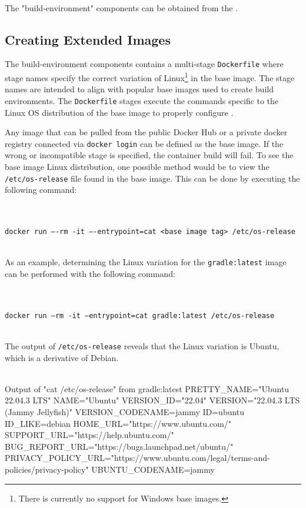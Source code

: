 \noindent\\The "build-environment" components can be obtained from the .


\subsection{Creating Extended Images}

The build-environment components contains a multi-stage \texttt{Dockerfile} where stage names
specify the correct variation of Linux\footnote{There is currently no support for Windows base images.}
in the base image.  The stage names are intended to align 
with popular base images used to create build environments.  The \texttt{Dockerfile} stages
execute the commands specific to the Linux OS distribution of the base image to properly configure
\scaresolver.

Any image that can be pulled from the public Docker Hub or a private docker registry connected via 
\texttt{docker login} can be defined as the base image.  If the wrong or incompatible stage is specified, 
the container build will fail. To see the base image Linux distribution, one possible method would be
to view the \texttt{/etc/os-release} file found in the base image.  This can be done by executing the following
command:

\noindent\\\\\texttt{docker run ----rm -it ----entrypoint=cat <base image tag> /etc/os-release}


\noindent\\As an example, determining the Linux variation for the \texttt{gradle:latest} image can
be performed with the following command:

\noindent\\\\\texttt{docker run --rm -it --entrypoint=cat gradle:latest /etc/os-release}

\noindent\\The output of \texttt{/etc/os-release} reveals that the Linux variation is Ubuntu, which is a derivative
of Debian.\\\\

\begin{code}{Output of "cat /etc/os-release" from gradle:latest}{}{}
PRETTY_NAME="Ubuntu 22.04.3 LTS"
NAME="Ubuntu"
VERSION_ID="22.04"
VERSION="22.04.3 LTS (Jammy Jellyfish)"
VERSION_CODENAME=jammy
ID=ubuntu
ID_LIKE=debian
HOME_URL="https://www.ubuntu.com/"
SUPPORT_URL="https://help.ubuntu.com/"
BUG_REPORT_URL="https://bugs.launchpad.net/ubuntu/"
PRIVACY_POLICY_URL="https://www.ubuntu.com/legal/terms-and-policies/privacy-policy"
UBUNTU_CODENAME=jammy
\end{code}




